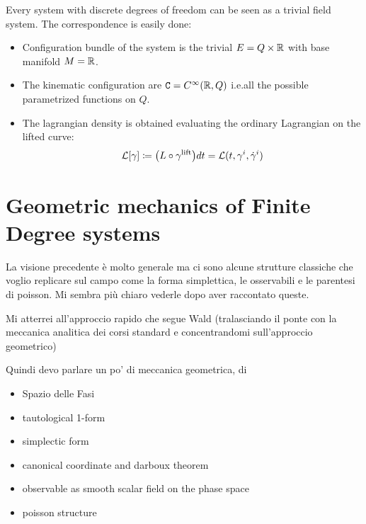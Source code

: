 \documentclass[Main]{subfiles}
\begin{document}
			\danger		
		
		  	Every system with discrete degrees of freedom can be seen as a trivial field system.
			The correspondence is easily done:
			\begin{itemize}
				\item Configuration bundle of the system is the trivial $E= Q \times \mathbb{R}$ with base manifold $M=\mathbb{R}$.
				\item The kinematic configuration are $\mathtt{C}=C^\infty(\mathbb{R},Q)$ i.e.all the possible parametrized functions on $Q$.
				\item The lagrangian density is obtained evaluating the ordinary Lagrangian on the lifted curve:
					\begin{equation}
						\mathcal{L}  [\gamma] \coloneqq \big( L \circ	\gamma^\textrm{lift} \big) dt  = \mathcal{L}(t,\gamma^i,\dot{\gamma}^i)
					\end{equation}
	\end{itemize}

		
	\section{Geometric mechanics of Finite Degree systems}\label{MechanicsAsAField}
	
	\danger	
	
	 La visione precedente è molto generale ma ci sono alcune strutture classiche che voglio replicare sul campo come la forma simplettica, le osservabili e le parentesi di poisson.
	 Mi sembra più chiaro vederle dopo aver raccontato queste.
	 
	 Mi atterrei all'approccio rapido che segue Wald (tralasciando il ponte con la meccanica analitica dei corsi standard e concentrandomi sull'approccio geometrico)
	
	Quindi devo parlare un po' di meccanica geometrica, di
	\begin{itemize}
		\item Spazio delle Fasi
		\item tautological 1-form
		\item simplectic form
		\item canonical coordinate and darboux theorem
		\item observable as smooth scalar field on the phase space
		\item poisson structure
	\end{itemize}
	 	 
\end{document}
